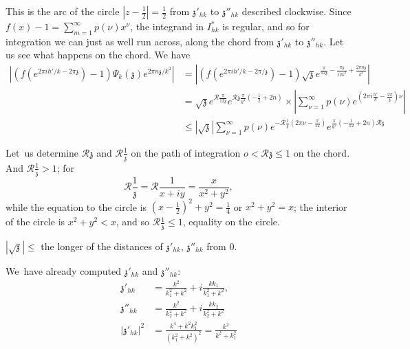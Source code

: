 This is the arc of the circle $| z- \frac{1}{2}| = \frac{1}{2}$ from
$\mathfrak{z}'_{hk}$ to $\mathfrak{z}''_{hk}$ described
clockwise. Since $f(x)-1= \sum\limits^\infty_{m=1} p (\nu) x^\nu$, the
integrand in $I^*_{hk}$ is regular, and so for integration we can just
as well run across, along the chord from $\mathfrak{z}'_{hk}$ to
$\mathfrak{z}''_{hk}$. Let us see what happens on the chord. We have
\begin{align*}
  \left|\left( f(e^{2 \pi i h'/k- 2 \pi \mathfrak{z}})-1\right) \Psi_k
  (\mathfrak{z}) e^{2 \pi n \mathfrak{z}/k^2}\right| & =
  \left|\left(f(e^{2 \pi i h'/k- 2 \pi /\mathfrak{z}})-1 \right)
  \sqrt{\mathfrak{z}} e^{\frac{\pi}{12 \mathfrak{z}}- \frac{\pi
      \mathfrak{z}}{12 k^2}+ \frac{2 \pi n
      \mathfrak{z}}{k^2}}\right|\\
  & = \sqrt{\mathfrak{z}} e^{\mathscr{R}\frac{\pi}{12 \mathfrak{z}}}
    e^{\mathscr{R} \mathfrak{z} \frac{\pi}{k^2} (- \frac{1}{2} + 2n)}
    \times \left| \sum^\infty_{\nu=1} p(\nu) e^{(2 \pi i \frac{h'}{k}-
      \frac{2 \pi}{\mathfrak{z}})\nu }\right|  \\
    & \leq |\sqrt{\mathfrak{z}}| \sum^\infty_{\nu=1} p(\nu) e^{-
      \mathscr{R} \frac{1}{\mathfrak{z}} (2 \pi \nu - \frac{\pi}{12})}
    e^{\frac{\pi}{k^2} (- \frac{1}{12} + 2n) \mathscr{R}\mathfrak{z} }
\end{align*}

Let\pageoriginale\ us determine $\mathscr{R}\mathfrak{z}$ and
$\mathscr{R} \frac{1}{\mathfrak{z}}$ on the path of integration $o <
  \mathscr{R} \mathfrak{z} \leq 1$ on the chord. And
$\mathscr{R} \frac{1}{\mathfrak{z}} > 1$; for 
$$
\mathscr{R} \frac{1}{\mathfrak{z}} = \mathscr{R} \frac{1}{x+ iy} =
\frac{x}{x^2+ y^2},
$$
while the equation to the circle is $(x- \frac{1}{2})^2+y^2=
\frac{1}{4}$ or $x^2 + y^2=x$; the interior of the circle is $x^2 +
y^2< x$, and so $\mathscr{R} \frac{1}{\mathfrak{z}} \leq 1$, equality
on the circle.

$|\sqrt{\mathfrak{z}}|\leq $ the longer of the distances of
$\mathfrak{z}'_{hk}$, $\mathfrak{z}''_{hk}$ from 0. 

We\pageoriginale\ have already computed $\mathfrak{z}'_{hk}$ and
$\mathfrak{z}''_{hk}$:
\begin{align*}
  \mathfrak{z}'_{hk} & = \frac{k^2}{k_1^2 + k^2} + i \frac{k
    k_1}{k_1^2 + k^2},\\
  \mathfrak{z}''_{hk} & = \frac{k^2}{k_2^2 + k^2} + i \frac{k
    k_2}{k_2^2 + k^2}\\
  |\mathfrak{z}'_{hk}|^2 & = \frac{k^4 + k^2 k_1^2}{(k_1^2+ k^2)^2} =
    \frac{k^2}{k^2+ k_1^2} 
 \end{align*}

